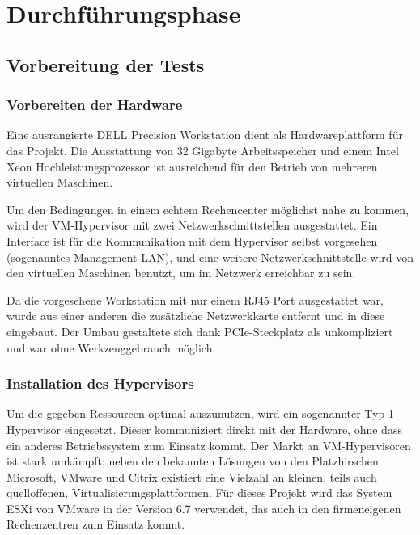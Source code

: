 \section{Durchführungsphase}
\label{sec:Durchführungsphase}

\subsection{Vorbereitung der Tests}
\label{sec:VorbereitungTests}

\subsubsection{Vorbereiten der Hardware}
\label{sec:VorbereitungHardware}
Eine ausrangierte DELL Precision Workstation dient als Hardwareplattform für das Projekt. Die Ausstattung von 32 Gigabyte Arbeitsspeicher und einem Intel Xeon Hochleistungsprozessor ist ausreichend für den Betrieb von mehreren virtuellen Maschinen.

Um den Bedingungen in einem \glqq{}echtem\grqq{} Rechencenter möglichst nahe zu kommen, wird der \ac{VM}-Hypervisor mit zwei Netzwerkschnittstellen ausgestattet. Ein Interface ist für die Kommunikation mit dem Hypervisor selbst vorgesehen (sogenanntes Management-\ac{LAN}), und eine weitere Netzwerkschnittstelle wird von den virtuellen Maschinen benutzt, um im Netzwerk erreichbar zu sein.

Da die vorgesehene Workstation mit nur einem RJ45 Port ausgestattet war, wurde aus einer anderen die zusätzliche Netzwerkkarte entfernt und in diese eingebaut. Der Umbau gestaltete sich dank PCIe-Steckplatz als unkompliziert und war ohne Werkzeuggebrauch möglich.

\subsubsection{Installation des Hypervisors}
\label{sec:InstallationHypervisor}
Um die gegeben Ressourcen optimal auszunutzen, wird ein sogenannter Typ 1-Hypervisor eingesetzt. Dieser kommuniziert direkt mit der Hardware, ohne dass ein anderes Betriebssystem zum Einsatz kommt. Der Markt an \ac{VM}-Hypervisoren ist stark umkämpft; neben den bekannten Lösungen von den \glqq{}Platzhirschen\grqq{} Microsoft, VMware und Citrix existiert eine Vielzahl an kleinen, teils auch quelloffenen, Virtualisierungsplattformen. Für dieses Projekt wird das System \glqq{}\ac{ESXi}\grqq{} von VMware in der Version 6.7 verwendet, das auch in den firmeneigenen Rechenzentren zum Einsatz kommt.

